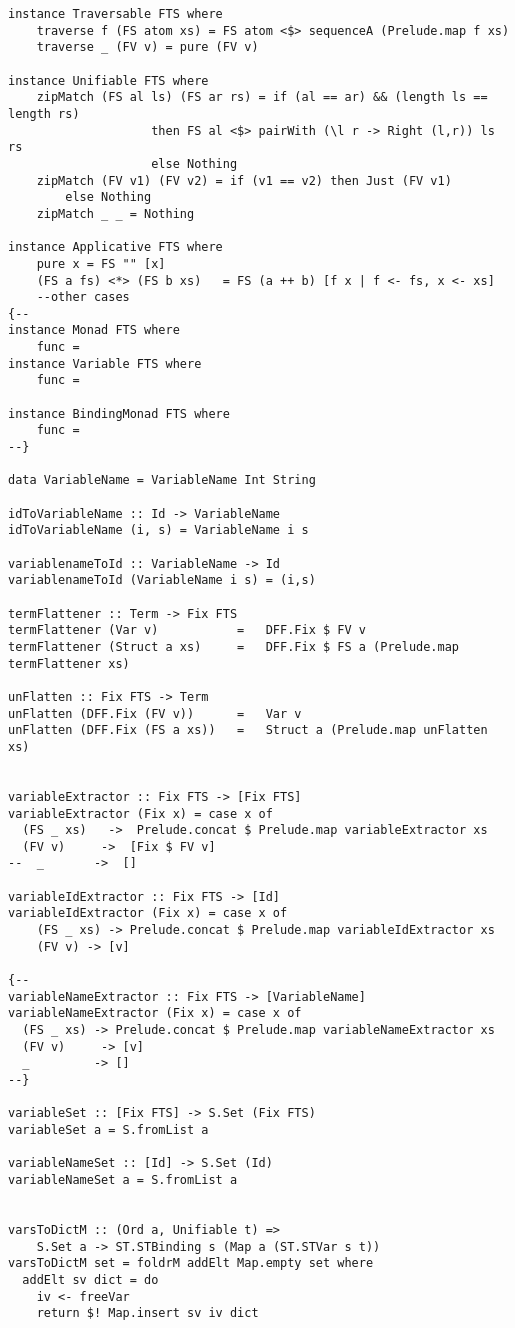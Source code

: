 \documentclass[thesis-solanki.tex]{files}
\begin{document}
\begin{verbatim}
instance Traversable FTS where
	traverse f (FS atom xs) = FS atom <$> sequenceA (Prelude.map f xs)
	traverse _ (FV v) =	pure (FV v)

instance Unifiable FTS where
	zipMatch (FS al ls) (FS ar rs) = if (al == ar) && (length ls == length rs)
      				then FS al <$> pairWith (\l r -> Right (l,r)) ls rs
      				else Nothing
	zipMatch (FV v1) (FV v2) = if (v1 == v2) then Just (FV v1) 
		else Nothing
	zipMatch _ _ = Nothing

instance Applicative FTS where
	pure x = FS "" [x]
	(FS a fs) <*> (FS b xs)   = FS (a ++ b) [f x | f <- fs, x <- xs]
	--other cases
{--
instance Monad FTS where
	func = 
instance Variable FTS where
	func = 

instance BindingMonad FTS where
	func = 
--}

data VariableName = VariableName Int String

idToVariableName :: Id -> VariableName
idToVariableName (i, s) = VariableName i s

variablenameToId :: VariableName -> Id
variablenameToId (VariableName i s) = (i,s)

termFlattener :: Term -> Fix FTS
termFlattener (Var v)           =   DFF.Fix $ FV v
termFlattener (Struct a xs)     =   DFF.Fix $ FS a (Prelude.map termFlattener xs)

unFlatten :: Fix FTS -> Term
unFlatten (DFF.Fix (FV v))      =   Var v
unFlatten (DFF.Fix (FS a xs))   =   Struct a (Prelude.map unFlatten xs)


variableExtractor :: Fix FTS -> [Fix FTS]
variableExtractor (Fix x) = case x of
  (FS _ xs)   ->  Prelude.concat $ Prelude.map variableExtractor xs
  (FV v)     ->  [Fix $ FV v]
--  _       ->  [] 

variableIdExtractor :: Fix FTS -> [Id]
variableIdExtractor (Fix x) = case x of
	(FS _ xs) -> Prelude.concat $ Prelude.map variableIdExtractor xs
	(FV v) -> [v]

{--
variableNameExtractor :: Fix FTS -> [VariableName]
variableNameExtractor (Fix x) = case x of
  (FS _ xs) -> Prelude.concat $ Prelude.map variableNameExtractor xs
  (FV v)     -> [v]
  _         -> [] 
--}

variableSet :: [Fix FTS] -> S.Set (Fix FTS)
variableSet a = S.fromList a

variableNameSet :: [Id] -> S.Set (Id)
variableNameSet a = S.fromList a


varsToDictM :: (Ord a, Unifiable t) =>
    S.Set a -> ST.STBinding s (Map a (ST.STVar s t))
varsToDictM set = foldrM addElt Map.empty set where
  addElt sv dict = do
    iv <- freeVar
    return $! Map.insert sv iv dict



\end{verbatim}
\end{document}
